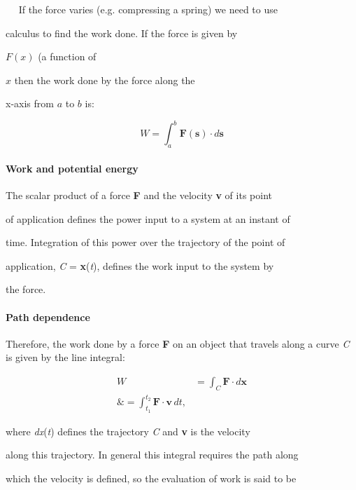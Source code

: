 $\quad$ If the force varies (e.g. compressing a spring) we need to use

    calculus to find the work done. If the force is given by

    $F(x)$ (a function of

    $x$ then the work done by the force along the

    x-axis from $a$ to $b$ is:



$$W = \int _{a}^{b} \mathbf{F(s)} \cdot d\mathbf{s}$$



\paragraph{Work and potential energy}



The scalar product of a force \textbf{F} and the velocity \textbf{v} of its point

of application defines the power input to a system at an instant of

time. Integration of this power over the trajectory of the point of

application, \textit{C} = \textbf{x}(\textit{t}), defines the work input to the system by

the force.



\paragraph{Path dependence}



Therefore, the work done by a force \textbf{F} on an object that travels along a curve \textit{C} is given by the line integral:



\begin{align}
W &= \int _C \mathbf{F} \cdot d\mathbf{x} \\\&=  \int _{t _1}^{t _2}\mathbf{F}\cdot \mathbf{v}\,dt,
\end{align}



where \textit{dx}(\textit{t}) defines the trajectory \textit{C} and \textbf{v} is the velocity

along this trajectory. In general this integral requires the path along

which the velocity is defined, so the evaluation of work is said to be

